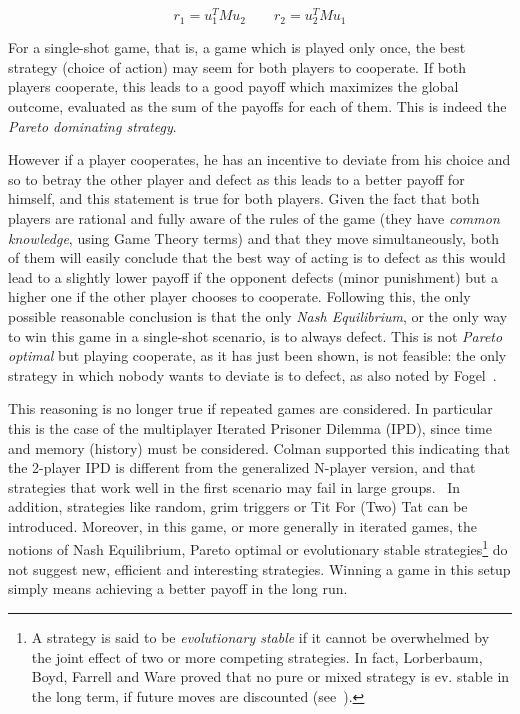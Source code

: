 \documentclass[journal,a4paper,10pt,twoside]{IEEEtran} %
\begin{document}
$$
r_1 = u_1^T M u_2
\quad
\quad
r_2 = u_2^T M u_1
$$

For a single-shot game, that is, a game which is played only once, the best strategy (choice of action) may seem for both players to cooperate. If both players cooperate, this leads to a good payoff which maximizes the global outcome, evaluated as the sum of the payoffs for each of them. This is indeed the \textit{Pareto dominating strategy}.

However if a player cooperates, he has an incentive to deviate from his choice and so to betray the other player and defect as this leads to a better payoff for himself, and this statement is true for both players. 
Given the fact that both players are rational and fully aware of the rules of the game (they have \textit{common knowledge}, using Game Theory terms) and that they move simultaneously, both of them will easily conclude that the best way of acting is to defect as this would lead to a slightly lower payoff if the opponent defects (minor punishment) but a higher one if the other player chooses to cooperate.
Following this, the only possible reasonable conclusion is that the only \textit{Nash Equilibrium}, or the only way to win this game in a single-shot scenario, is to always defect.
This is not \textit{Pareto optimal} but playing cooperate, as it has just been shown, is not feasible: the only strategy in which nobody wants to deviate is to defect, as also noted by Fogel~\cite{fogelEvolvingBehaviors}.

This reasoning is no longer true if repeated games are considered. In particular this is the case of the multiplayer Iterated Prisoner Dilemma (IPD), since time and memory (history) must be considered.
Colman supported this indicating that the 2-player IPD is different from the generalized N-player version, and that strategies that work well in the first scenario may fail in large groups.~\cite{yao1994experimental}
In addition, strategies like random, grim triggers or Tit For (Two) Tat can be introduced.
Moreover, in this game, or more generally in iterated games, the notions of Nash Equilibrium, Pareto optimal or evolutionary stable strategies\footnote{A strategy is said to be \textit{evolutionary stable} if it cannot be overwhelmed by the joint effect of two or more competing strategies. In fact, Lorberbaum, Boyd, Farrell and Ware proved that no pure or mixed strategy is ev. stable in the long term, if future moves are discounted (see~\cite{lorb94}).} do not suggest new, efficient and interesting strategies. \cite{mathieu2017}
Winning a game in this setup simply means achieving a better payoff in the long run.
\end{document}

